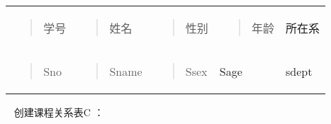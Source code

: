 \documentclass[
]{article}
\begin{document}
\begin{longtable}[]{@{}lllll@{}}
\toprule
\endhead
\begin{minipage}[t]{0.17\columnwidth}\raggedright
\begin{quote}
学号
\end{quote}\strut
\end{minipage} & \begin{minipage}[t]{0.17\columnwidth}\raggedright
\begin{quote}
姓名
\end{quote}\strut
\end{minipage} & \begin{minipage}[t]{0.17\columnwidth}\raggedright
\begin{quote}
性别
\end{quote}\strut
\end{minipage} & \begin{minipage}[t]{0.17\columnwidth}\raggedright
\begin{quote}
年龄
\end{quote}\strut
\end{minipage} & \begin{minipage}[t]{0.17\columnwidth}\raggedright
所在系\strut
\end{minipage}\tabularnewline
\begin{minipage}[t]{0.17\columnwidth}\raggedright
\begin{quote}
Sno
\end{quote}\strut
\end{minipage} & \begin{minipage}[t]{0.17\columnwidth}\raggedright
\begin{quote}
Sname
\end{quote}\strut
\end{minipage} & \begin{minipage}[t]{0.17\columnwidth}\raggedright
\begin{quote}
Ssex
\end{quote}\strut
\end{minipage} & \begin{minipage}[t]{0.17\columnwidth}\raggedright
Sage\strut
\end{minipage} & \begin{minipage}[t]{0.17\columnwidth}\raggedright
sdept\strut
\end{minipage}\tabularnewline
\bottomrule
\end{longtable}

~ 创建课程关系表C ：
\end{document}
